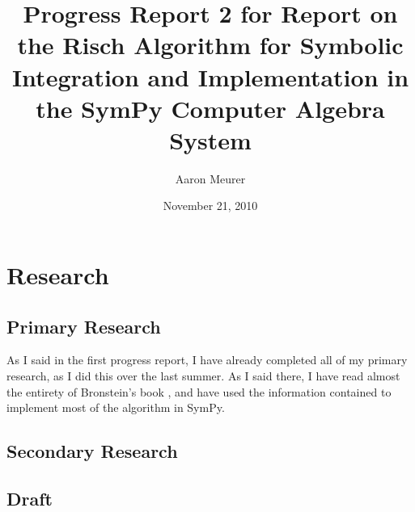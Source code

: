 \documentclass[12pt]{article}
\begin{document}
\title{Progress Report 2 for Report on the Risch Algorithm for Symbolic
Integration and Implementation in the Sym\-Py Computer Algebra System}
\author{Aaron Meurer}
\date{November 21, 2010}
\maketitle


\section{Research}
\subsection{Primary Research}
As I said in the first progress report, I have already completed all of
my primary research, as I did this over the last summer.  As I said
there, I have read almost the entirety of Bronstein's book \cite{bronstein2005symbolic}, and have
used the information contained to implement most of the algorithm in
Sym\-Py.

\subsection{Secondary Research}

\subsection{Draft}



\end{document}
